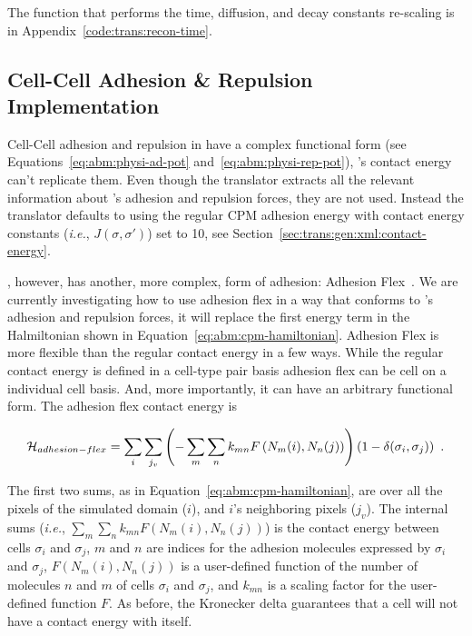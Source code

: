 The function that performs the time, diffusion, and decay constants re-scaling is in Appendix~\ref{code:trans:recon-time}.

\subsection{Cell-Cell Adhesion \& Repulsion Implementation}\label{sec:trans:chal:adhesion}

Cell-Cell adhesion and repulsion in \pscs have a complex functional form (see Equations~\ref{eq:abm:physi-ad-pot} and~\ref{eq:abm:physi-rep-pot}), \ccd's contact energy can't replicate them. 
Even though the translator extracts all the relevant information about \psc's adhesion and repulsion forces, they are not used. Instead the translator defaults to using the regular CPM adhesion energy with contact energy constants (\textit{i.e.}, $J(\sigma, \sigma')$) set to 10, see Section~\ref{sec:trans:gen:xml:contact-energy}.

\ccd, however, has another, more complex, form of adhesion: Adhesion Flex~\cite{compucell3d_reference}. We are currently investigating how to use adhesion flex in a way that conforms to \psc's adhesion and repulsion forces, it will replace the first energy term in the Halmiltonian shown in Equation~\ref{eq:abm:cpm-hamiltonian}. Adhesion Flex is more flexible than the regular contact energy in a few ways. While the regular contact energy is defined in a cell-type pair basis adhesion flex can be cell on a individual cell basis. And, more importantly, it can have an arbitrary functional form. The adhesion flex contact energy is 

\begin{equation}\label{eq:trans:cc3d:adhesion-flex}
\mathcal{H}_{adhesion-flex} = \sum_{i}\sum_{j_v} \left(- \sum_m \sum_n k_{mn} F\left(N_m (i), N_n(j) \right) \right)\left(1 - \delta(\sigma_i, \sigma_j) \right)\,\,.
\end{equation}

\noindent The first two sums, as in Equation~\ref{eq:abm:cpm-hamiltonian}, are over all the pixels of the simulated domain ($i$), and $i$'s neighboring pixels ($j_v$). The internal sums (\textit{i.e.}, $\sum_m \sum_n k_{mn} F\left(N_m (i), N_n(j) \right)$) is the contact energy between cells $\sigma_i$ and $\sigma_j$, $m$ and $n$ are indices for the adhesion molecules expressed by $\sigma_i$ and $\sigma_j$, $F\left(N_m (i), N_n(j) \right)$ is a user-defined function of the number of molecules $n$ and $m$ of cells $\sigma_i$ and $\sigma_j$, and $k_{mn}$ is a scaling factor for the user-defined function $F$. As before, the Kronecker delta guarantees that a cell will not have a contact energy with itself. 

